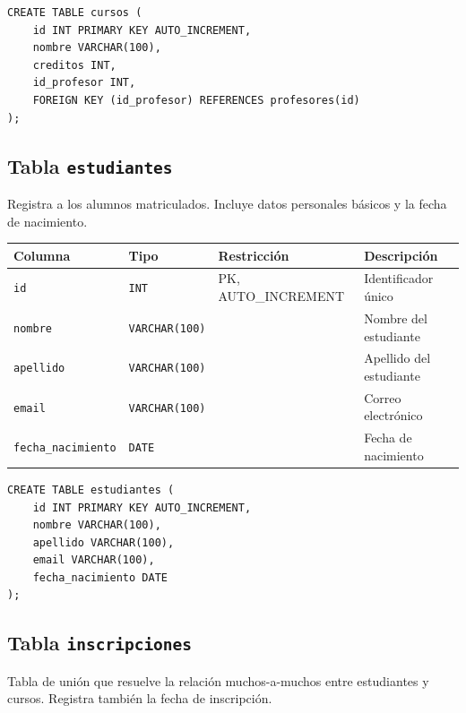 \documentclass[12pt,a4paper]{article}
\begin{document}
\begin{lstlisting}[caption={SQL -- cursos}]
CREATE TABLE cursos (
    id INT PRIMARY KEY AUTO_INCREMENT,
    nombre VARCHAR(100),
    creditos INT,
    id_profesor INT,
    FOREIGN KEY (id_profesor) REFERENCES profesores(id)
);
\end{lstlisting}
 
\subsection{Tabla \texttt{estudiantes}}
 
Registra a los alumnos matriculados. Incluye datos personales básicos
y la fecha de nacimiento.
 
\begin{center}
\begin{tabular}{llll}
  \hline
  \textbf{Columna} & \textbf{Tipo} & \textbf{Restricción} & \textbf{Descripción} \\
  \hline
  \texttt{id}                & \texttt{INT}          & PK, AUTO\_INCREMENT & Identificador único \\
  \texttt{nombre}            & \texttt{VARCHAR(100)} &                     & Nombre del estudiante \\
  \texttt{apellido}          & \texttt{VARCHAR(100)} &                     & Apellido del estudiante \\
  \texttt{email}             & \texttt{VARCHAR(100)} &                     & Correo electrónico \\
  \texttt{fecha\_nacimiento} & \texttt{DATE}         &                     & Fecha de nacimiento \\
  \hline
\end{tabular}
\end{center}
 
\begin{lstlisting}[caption={SQL -- estudiantes}]
CREATE TABLE estudiantes (
    id INT PRIMARY KEY AUTO_INCREMENT,
    nombre VARCHAR(100),
    apellido VARCHAR(100),
    email VARCHAR(100),
    fecha_nacimiento DATE
);
\end{lstlisting}
 
\subsection{Tabla \texttt{inscripciones}}
 
Tabla de unión que resuelve la relación muchos-a-muchos entre
estudiantes y cursos. Registra también la fecha de inscripción.
 
\end{document}
